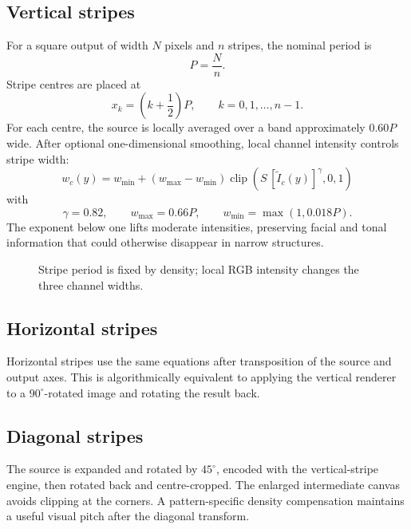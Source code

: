 \documentclass[10.5pt,a4paper]{article}
\newcommand{\clip}{\operatorname{clip}}
\begin{document}
\subsection{Vertical stripes}
For a square output of width $N$ pixels and $n$ stripes, the nominal period is
\begin{equation}
P=\frac{N}{n}.
\end{equation}
Stripe centres are placed at
\begin{equation}
x_k=\left(k+\frac{1}{2}\right)P,\qquad k=0,1,\ldots,n-1.
\end{equation}
For each centre, the source is locally averaged over a band approximately $0.60P$ wide. After optional one-dimensional smoothing, local channel intensity controls stripe width:
\begin{equation}
\boxed{
 w_c(y)=w_{\min}+\left(w_{\max}-w_{\min}\right)
 \clip\!\left(S\,[\widetilde I_c(y)]^{\gamma},0,1\right)
}
\end{equation}
with
\begin{equation}
\gamma=0.82,\qquad
w_{\max}=0.66P,\qquad
w_{\min}=\max(1,0.018P).
\end{equation}
The exponent below one lifts moderate intensities, preserving facial and tonal information that could otherwise disappear in narrow structures.

\begin{figure}[H]
\centering
{}
\caption{Stripe period is fixed by density; local RGB intensity changes the three channel widths.}
\end{figure}

\subsection{Horizontal stripes}
Horizontal stripes use the same equations after transposition of the source and output axes. This is algorithmically equivalent to applying the vertical renderer to a $90^\circ$-rotated image and rotating the result back.

\subsection{Diagonal stripes}
The source is expanded and rotated by $45^\circ$, encoded with the vertical-stripe engine, then rotated back and centre-cropped. The enlarged intermediate canvas avoids clipping at the corners. A pattern-specific density compensation maintains a useful visual pitch after the diagonal transform.
\end{document}
